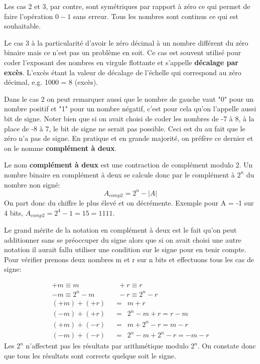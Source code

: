 Les cas 2 et 3, par contre, sont symétriques par rapport à zéro ce qui permet de faire l'opération $0-1$ sans erreur. Tous les nombres sont continus ce qui est souhaitable.

Le cas 3 à la particularité d'avoir le zéro décimal à un nombre différent du zéro binaire mais ce n'est pas un problème en soit. Ce cas est souvent utilisé pour coder l'exposant des nombres en virgule flottante et s'appelle \textbf{décalage par excès}. L'excès étant la valeur de décalage de l'échelle qui correspond au zéro décimal, e.g. 1000 = 8 (excès).

Dans le cas 2 on peut remarquer aussi que le nombre de gauche vaut "0" pour un nombre positif et "1" pour un nombre négatif, c'est pour cela qu'on l'appelle aussi bit de signe. Noter bien que si on avait choisi de coder les nombres de -7 à 8, à la place de -8 à 7, le bit de signe ne serait pas possible. Ceci est du au fait que le zéro n'a pas de signe. En pratique et en grande majorité, on préfère ce dernier et on le nomme \textbf{complément à deux}. 

Le nom \textbf{complément à deux} est une contraction de complément modulo 2. Un nombre binaire en complément à deux se calcule donc par le complément à $2^n$ du nombre non signé:
\begin{equation}
A_{comp2} = 2^n - |A|
\end{equation}
On part donc du chiffre le plus élevé et on décrémente. Exemple pour A = -1 sur 4 bits, $A_{comp2} = 2^4 - 1 = 15 = 1111$.

Le grand mérite de la notation en complément à deux est le fait qu'on peut additionner sans se préoccuper du signe alors que si on avait choisi une autre notation il aurait fallu utiliser une condition sur le signe pour en tenir compte. Pour vérifier prenons deux nombres m et r sur n bits et effectuons tous les cas de signe:

\begin{equation}
\begin{aligned}
+m \equiv m \enspace & \enspace +r \equiv r\\
-m \equiv 2^n-m \enspace & \enspace -r \equiv 2^n-r\\
(+m) + (+r) \enspace &= \enspace m + r\\
(-m) + (+r) \enspace &= \enspace 2^{n} - m + r = r-m\\
(+m) + (-r) \enspace &= \enspace m + 2^{n} - r = m-r\\
(-m) + (-r) \enspace &= \enspace 2^{n} - m + 2^{n} - r = -m-r
\end{aligned}
\end{equation}
Les $2^n$ n'affectent pas les résultats par arithmétique modulo $2^n$. On constate donc que tous les résultats sont corrects quelque soit le signe. 


